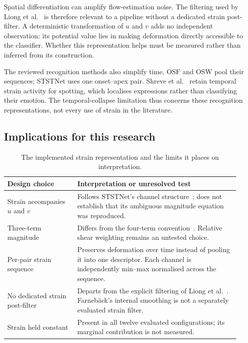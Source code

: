 Spatial differentiation can amplify flow-estimation noise. The filtering used by Liong et al.~\cite{liong2014a,liong2016} is therefore relevant to a pipeline without a dedicated strain post-filter. A deterministic transformation of $u$ and $v$ adds no independent observation: its potential value lies in making deformation directly accessible to the classifier. Whether this representation helps must be measured rather than inferred from its construction.

The reviewed recognition methods also simplify time. OSF and OSW pool their sequences; STSTNet uses one onset--apex pair. Shreve et al.~\cite{shreve2011} retain temporal strain activity for spotting, which localises expressions rather than classifying their emotion. The temporal-collapse limitation thus concerns these recognition representations, not every use of strain in the literature.

\subsection{Implications for this research}
\label{sec:strain-implications}

\begin{table}[htbp]
    \centering
    \small
    \begin{tabular}{@{}p{0.29\linewidth} p{0.65\linewidth}@{}}
        \hline
        \textbf{Design choice} & \textbf{Interpretation or unresolved test} \\
        \hline
        Strain accompanies $u$ and $v$
        & Follows STSTNet's channel structure~\cite{liong2019b}; does not establish that its ambiguous magnitude equation was reproduced. \\
        Three-term magnitude
        & Differs from the four-term convention~\cite{liong2014a,liong2014b,liong2016}. Relative shear weighting remains an untested choice. \\
        Per-pair strain sequence
        & Preserves deformation over time instead of pooling it into one descriptor. Each channel is independently min--max normalised across the sequence. \\
        No dedicated strain post-filter
        & Departs from the explicit filtering of Liong et al.~\cite{liong2014a}. Farneb\"ack's internal smoothing is not a separately evaluated strain filter. \\
        Strain held constant
        & Present in all twelve evaluated configurations; its marginal contribution is not measured. \\
        \hline
    \end{tabular}
    \caption[Strain representation and unresolved choices]{The implemented strain representation and the limits it places on interpretation.}
    \label{tab:strain-decisions}
\end{table}

